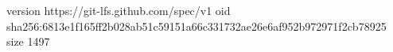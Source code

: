 version https://git-lfs.github.com/spec/v1
oid sha256:6813e1f165ff2b028ab51c59151a66c331732ae26e6af952b972971f2cb78925
size 1497
